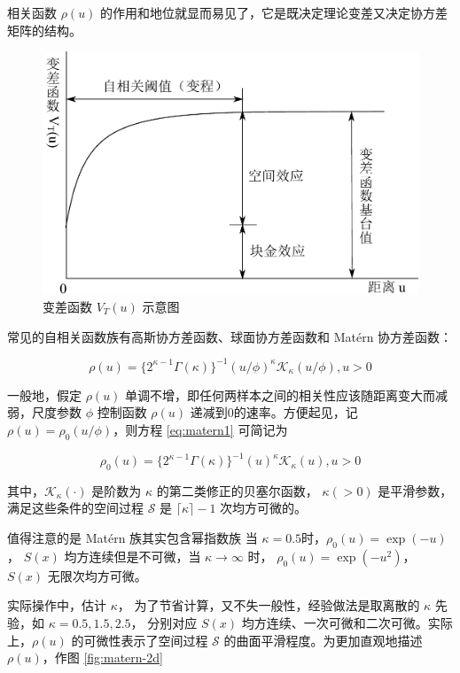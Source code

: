\documentclass[12pt,a4paper,UTF8,twoside]{book}
\theoremstyle{definition}
\theoremstyle{definition}
\theoremstyle{definition}
\theoremstyle{remark}
\begin{document}
\noindent 相关函数 \(\rho(u)\)
的作用和地位就显而易见了，它是既决定理论变差又决定协方差矩阵的结构。

\begin{figure}

{\centering \includegraphics[width=0.7\linewidth]{figures/semi-variance} 

}

\caption{变差函数 $V_{T}(u)$ 示意图}\label{fig:semi-variance}
\end{figure}

常见的自相关函数族有高斯协方差函数、球面协方差函数和 Matérn 协方差函数：

\begin{equation}
\rho(u)=\{2^{\kappa -1}\Gamma(\kappa)\}^{-1}(u/\phi)^{\kappa}\mathcal{K}_{\kappa}(u/\phi),u > 0 \label{eq:matern1}
\end{equation}

\noindent 一般地，假定 \(\rho(u)\)
单调不增，即任何两样本之间的相关性应该随距离变大而减弱，尺度参数
\(\phi\) 控制函数 \(\rho(u)\) 递减到0的速率。方便起见，记
\(\rho(u) = \rho_{0}(u/\phi)\)，则方程 \eqref{eq:matern1} 可简记为

\begin{equation}
\rho_{0}(u)=\{2^{\kappa -1}\Gamma(\kappa)\}^{-1}(u)^{\kappa}\mathcal{K}_{\kappa}(u),u > 0 \label{eq:matern2}
\end{equation}

\noindent 其中，\(\mathcal{K}_{\kappa}(\cdot)\) 是阶数为 \(\kappa\)
的第二类修正的贝塞尔函数， \(\kappa(>0)\)
是平滑参数，满足这些条件的空间过程 \(\mathcal{S}\) 是
\(\lceil\kappa\rceil-1\) 次均方可微的。

值得注意的是 Matérn 族其实包含幂指数族 \noindent 当
\(\kappa = 0.5\)时，\(\rho_{0}(u) = \exp(-u)\)， \(S(x)\)
均方连续但是不可微，当 \(\kappa \to \infty\) 时，
\(\rho_{0}(u) = \exp(-u^2)\)， \(S(x)\) 无限次均方可微。

实际操作中，估计 \(\kappa\)，
为了节省计算，又不失一般性，经验做法是取离散的 \(\kappa\) 先验，如
\(\kappa = 0.5, 1.5, 2.5\)， 分别对应 \(S(x)\)
均方连续、一次可微和二次可微。实际上，\(\rho(u)\) 的可微性表示了空间过程
\(\mathcal{S}\) 的曲面平滑程度。为更加直观地描述 \(\rho(u)\)，作图
\ref{fig:matern-2d}
\end{document}
